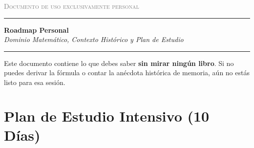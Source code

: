 \documentclass[11pt, letterpaper]{article}
\begin{document}
\begin{titlepage}
\begin{center}
\vspace*{1cm}
{\footnotesize\textsc{\textcolor{gray}{Documento de uso exclusivamente personal}}}
\vspace{0.5cm}
\textcolor{roshblue}{\rule{\linewidth}{1pt}}
\vspace{0.4cm}
{\LARGE\bfseries\color{roshblue} Roadmap Personal}\\[0.4em]
{\large\itshape\color{gray} Dominio Matem\'atico, Contexto Hist\'orico y Plan de Estudio}
\vspace{0.3cm}
\textcolor{roshblue}{\rule{\linewidth}{1pt}}
\vspace{1.5cm}

\begin{tcolorbox}[colback=warningyellow, colframe=warningborder, boxrule=0.6pt]
Este documento contiene lo que debes saber \textbf{sin mirar ning\'un libro}. Si no puedes derivar la f\'ormula o contar la an\'ecdota hist\'orica de memoria, a\'un no est\'as listo para esa sesi\'on.
\end{tcolorbox}
\end{center}
\end{titlepage}

\newpage

\section{Plan de Estudio Intensivo (10 D\'ias)}
\end{document}

